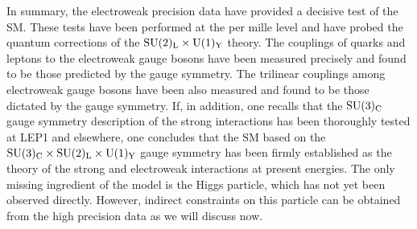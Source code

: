 \begin{figure}[h!]
\vspace*{-.9cm}
\begin{center}
\begin{minipage}{8cm}
\vspace*{1cm}
\hspace*{-2mm}
\end{minipage}
\begin{minipage}{8cm}
\hspace*{-5mm}
\end{minipage}
\end{center}
\vspace*{0mm}
\label{fig:WWcross-section}
\vspace*{-1mm}
\end{figure}

In summary, the electroweak precision data have provided a decisive test of the
SM. These tests have been performed at the per mille level and have probed the
quantum corrections of the ${\rm SU(2)_L\times U(1)_Y}$ theory. The couplings
of quarks and leptons to the electroweak gauge bosons have been measured
precisely and found to be those predicted by the gauge symmetry.  The trilinear
couplings among electroweak gauge bosons have been also measured and found to
be those dictated by the gauge symmetry.  If, in addition, one recalls that the
${\rm SU(3)_C}$ gauge symmetry description of the strong interactions has been
thoroughly tested at LEP1 and elsewhere,  one concludes that the SM based on
the ${\rm SU(3)_C\times SU(2)_L\times U(1)_Y}$ gauge symmetry has been firmly
established as the theory of the strong and electroweak interactions at present
energies. The only missing ingredient of the model is the Higgs particle, which
has not yet been observed directly.  However, indirect constraints on this
particle can be obtained from the high precision data as we will discuss now.  

